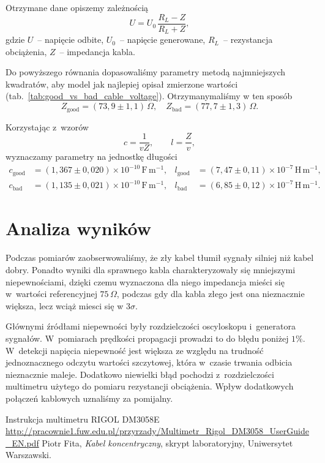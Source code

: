 \documentclass[12pt]{article}
\begin{document}
Otrzymane dane opiszemy zależnością \cite{skrypt}
\[
  U = U_0\,\frac{R_L - Z}{R_L + Z},
\]
\noindent gdzie $U$~-- napięcie odbite, $U_0$~-- napięcie generowane, $R_L$~-- rezystancja obciążenia, $Z$~-- impedancja kabla. 

Do powyższego równania dopasowaliśmy parametry metodą najmniejszych kwadratów, aby model jak najlepiej opisał zmierzone wartości (tab.~\ref{tab:good_vs_bad_cable_voltage}). Otrzymanymaliśmy w ten sposób
\[
  Z_{\mathrm{good}}=(73{,}9\pm1{,}1)\,\Omega,\quad
  Z_{\mathrm{bad}}=(77{,}7\pm1{,}3)\,\Omega.
\]

Korzystając z~wzorów \cite{skrypt}
\[
  c=\frac{1}{v Z},\qquad l=\frac{Z}{v},
\]
wyznaczamy parametry na jednostkę długości
\begin{align*}
  c_{\mathrm{good}} &= (1{,}367\pm0{,}020)\times10^{-10}\,\mathrm{F\,m^{-1}}, &
  l_{\mathrm{good}} &= (7{,}47\pm0{,}11)\times10^{-7}\,\mathrm{H\,m^{-1}},\\
  c_{\mathrm{bad}}  &= (1{,}135\pm0{,}021)\times10^{-10}\,\mathrm{F\,m^{-1}}, &
  l_{\mathrm{bad}}  &= (6{,}85\pm0{,}12)\times10^{-7}\,\mathrm{H\,m^{-1}}.
\end{align*}

\section{Analiza wyników}
Podczas pomiarów zaobserwowaliśmy, że zły kabel tłumił sygnały silniej niż kabel dobry. Ponadto wyniki dla sprawnego kabla charakteryzowały się mniejszymi niepewnościami, dzięki czemu wyznaczona dla niego impedancja mieści się w~wartości referencyjnej \(75\,\Omega\), podczas gdy dla kabla złego jest ona nieznacznie większa, lecz wciąż miesci się w \(3 \sigma\).

Głównymi źródłami niepewności były rozdzielczości oscyloskopu i~generatora sygnałów. W~pomiarach prędkości propagacji prowadzi to do błędu poniżej \(1\%\). W~detekcji napięcia niepewność jest większa ze względu na trudność jednoznacznego odczytu wartości szczytowej, która w~czasie trwania odbicia nieznacznie maleje. Dodatkowo niewielki błąd pochodzi z~rozdzielczości multimetru użytego do pomiaru rezystancji obciążenia. Wpływ dodatkowych połączeń kablowych uznaliśmy za pomijalny.

\vspace{1 in}

\begin{thebibliography}{2}

Instrukcja multimetru RIGOL DM3058E \url{http://pracownie1.fuw.edu.pl/przyrzady/Multimetr_Rigol_DM3058_UserGuide_EN.pdf}
Piotr Fita, \emph{Kabel koncentryczny}, skrypt laboratoryjny, Uniwersytet Warszawski.

\end{thebibliography}
\end{document}
